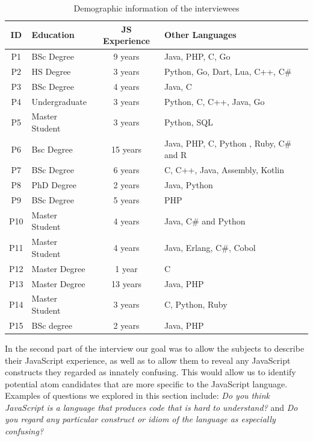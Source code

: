 \begin{table}[htb!]
  \centering
\caption{Demographic information of the interviewees}
\begin{scriptsize}  
\begin{tabular}{clcl}
\toprule
ID & Education & JS Experience & Other Languages \\ \midrule 
P1 & BSc Degree & 9 years & Java, PHP, C, Go  
\\ 
P2 & HS Degree & 3 years & Python, Go, Dart, Lua, C++, C\#
\\ 
P3 & BSc Degree & 4 years & Java, C
\\ 
P4 & Undergraduate & 3 years & Python, C, C++, Java, Go
\\ 
P5 & Master Student & 3 years & Python, SQL
\\ 
P6 & Bsc Degree & 15  years  & Java, PHP, C, Python , Ruby, C\# and R
\\ 
P7 & BSc Degree  & 6 years & C, C++, Java, Assembly, Kotlin
\\ 
P8 & PhD Degree & 2 years & Java, Python
\\ 
P9 & BSc Degree  & 5 years & PHP
\\ 
P10 & Master Student & 4 years & Java, C\# and Python
\\ 
P11 & Master Student & 4 years & Java, Erlang, C\#, Cobol
\\ 
P12 & Master Degree & 1 year & C
\\ 
P13 & Master Degree & 13 years & Java, PHP
\\ 
P14 & Master Student & 3 years & C, Python, Ruby
\\ 
P15 &  BSc degree  & 2 years & Java, PHP
\\ \bottomrule
\end{tabular}
\end{scriptsize}
    
    \label{pinterview}
\end{table}

In the second part of the interview our goal was to allow the subjects to describe their JavaScript experience, as well as to allow them to reveal any JavaScript constructs they regarded as innately confusing. This would allow us to identify potential atom candidates that are more specific to the JavaScript language. Examples of questions we explored in this section include: \emph{Do you think JavaScript is a language that produces code that is hard to understand?} and \emph{Do you regard any particular construct or idiom of the language as
  especially confusing?}

